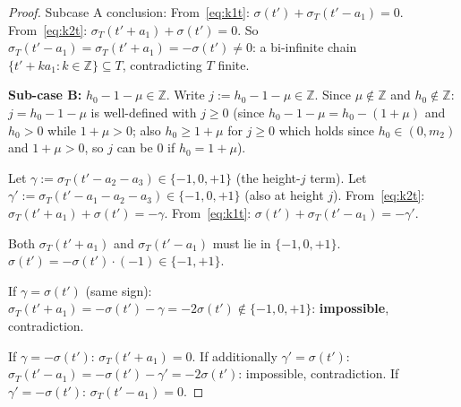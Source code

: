 \documentclass{article}
\begin{document}
\begin{proof}
Subcase A conclusion: From~\eqref{eq:k1t}: $\sigma(t')+\sigma_T(t'-a_1)=0$.
From~\eqref{eq:k2t}: $\sigma_T(t'+a_1)+\sigma(t')=0$.
So $\sigma_T(t'-a_1)=\sigma_T(t'+a_1)=-\sigma(t')\ne 0$: a bi-infinite chain $\{t'+ka_1:k\in\mathbb{Z}\}\subseteq T$, contradicting $T$ finite.

\textbf{Sub-case B:} $h_0-1-\mu\in\mathbb{Z}$.  Write $j:=h_0-1-\mu\in\mathbb{Z}$.
Since $\mu\notin\mathbb{Z}$ and $h_0\notin\mathbb{Z}$: $j=h_0-1-\mu$ is well-defined with $j\ge 0$
(since $h_0-1-\mu=h_0-(1+\mu)$ and $h_0>0$ while $1+\mu>0$; also $h_0\ge 1+\mu$ for $j\ge 0$
which holds since $h_0\in(0,m_2)$ and $1+\mu>0$, so $j$ can be $0$ if $h_0=1+\mu$).

Let $\gamma:=\sigma_T(t'-a_2-a_3)\in\{-1,0,+1\}$ (the height-$j$ term).
Let $\gamma':=\sigma_T(t'-a_1-a_2-a_3)\in\{-1,0,+1\}$ (also at height $j$).
From~\eqref{eq:k2t}: $\sigma_T(t'+a_1)+\sigma(t')=-\gamma$.
From~\eqref{eq:k1t}: $\sigma(t')+\sigma_T(t'-a_1)=-\gamma'$.

Both $\sigma_T(t'+a_1)$ and $\sigma_T(t'-a_1)$ must lie in $\{-1,0,+1\}$.
$\sigma(t')=-\sigma(t')\cdot(-1)\in\{-1,+1\}$.

If $\gamma=\sigma(t')$ (same sign): $\sigma_T(t'+a_1)=-\sigma(t')-\gamma=-2\sigma(t')\notin\{-1,0,+1\}$: \textbf{impossible}, contradiction.

If $\gamma=-\sigma(t')$: $\sigma_T(t'+a_1)=0$.
If additionally $\gamma'=\sigma(t')$: $\sigma_T(t'-a_1)=-\sigma(t')-\gamma'=-2\sigma(t')$: impossible, contradiction.
If $\gamma'=-\sigma(t')$: $\sigma_T(t'-a_1)=0$.


\end{proof}
\end{document}
